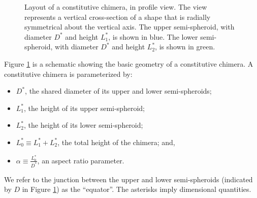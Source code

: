 \documentclass[10pt,a4paper]{article}
\begin{document}
\begin{figure}[t] 
	\begin{center}
	\end{center}
	\caption{Layout of a constitutive chimera, in profile view. The view represents a vertical cross-section of a shape that is radially symmetrical about the vertical axis. The upper semi-spheroid, with diameter $D^*$ and height $L_1^*$, is shown in blue. The lower semi-spheroid, with diameter $D^*$ and height $L^*_2$, is shown in green. } \label{chimera1}
\end{figure}
\noindent
Figure \ref{chimera1} is a schematic showing the basic geometry of a constitutive chimera.
A constitutive chimera is parameterized by:
\begin{itemize}
	\item $D^*$, the shared diameter of its upper and lower semi-spheroids;
	\item $L_1^*$, the height of its upper semi-spheroid;
	\item $L_2^*$, the height of its  lower semi-spheroid; 
	\item $L_0^* \equiv L_1^* + L_2^*$, the total height of the chimera; and,
	\item $\alpha \equiv \frac{L_0^*}{D^*}$, an aspect ratio parameter.
\end{itemize}
We refer to the junction between the upper and lower semi-spheroids (indicated by $D$ in Figure \ref{chimera1}) as the ``equator''.
The asterisks imply dimensional quantities.
\end{document}
